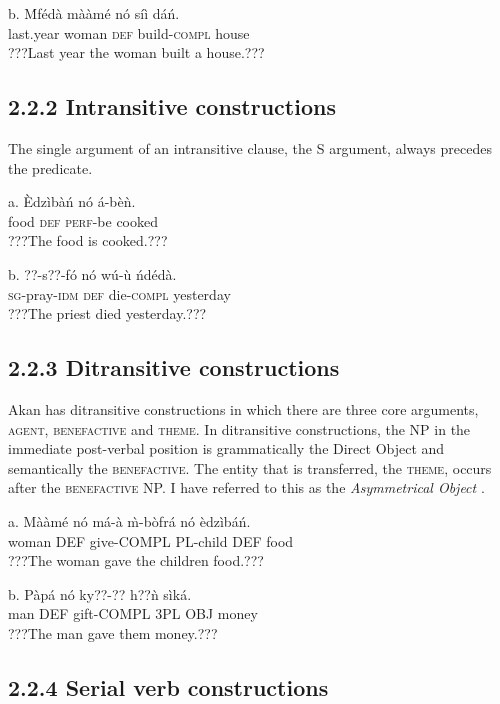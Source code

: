 \documentclass[output=paper]{langsci/langscibook}
\begin{document}
\ea
\gll  b.  \'{M}fédà    mààmé    nó  síì    dáń.\\
       last.year  woman    \textsc{def}  build-\textsc{compl}  house\\
\glt   ???Last year the woman built a house.???
\z

\subsection{2.2.2  Intransitive constructions}

The single argument of an intransitive clause, the S argument, always precedes the predicate. 


\ea
\gll a.  \`{E}dzìbàń  nó  á-bèǹ.  \\
       food    \textsc{def}  \textsc{perf}{}-be cooked\\
\glt   ???The food is cooked.???  
\z

\ea
\gll b.  ??{}-s??-fó      nó  wú-\`{u}    ńdédà.\\
       \textsc{sg}{}-pray-\textsc{idm}    \textsc{def}  die-\textsc{compl}  yesterday\\
\glt   ???The priest died yesterday.???
\z

\subsection{2.2.3  Ditransitive constructions}

Akan has ditransitive constructions in which there are three core arguments, \textsc{agent, benefactive} and \textsc{theme}. In ditransitive constructions, the NP in the immediate post-verbal position is grammatically the Direct Object and semantically the \textsc{benefactive}. The entity that is transferred, the \textsc{theme}, occurs after the \textsc{benefactive} NP. I have referred to this as the \emph{Asymmetrical Object} \citep{Osam2000}.


\ea
\gll a.  Mààmé    nó  má-à    \`{m}-bòfrá  nó  èdzìbáń.\\
       woman    DEF  give-COMPL  PL-child  DEF  food\\
\glt   ???The woman gave the children food.???
\z

\ea
\gll  b.  Pàpá  nó  ky??-??    h??ǹ    sìká.\\
       man  DEF  gift-COMPL  3PL OBJ  money\\
\glt   ???The man gave them money.???  
\z

\subsection{2.2.4  Serial verb constructions}
\end{document}
